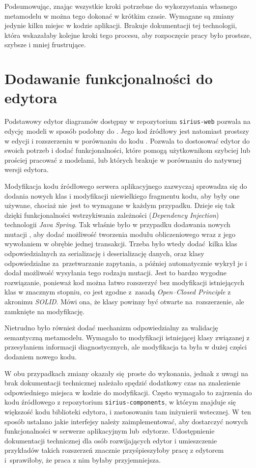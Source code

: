 Podsumowując, znając wszystkie kroki potrzebne do wykorzystania własnego
metamodelu \EMF{} w \SiriusWeb{} można tego dokonać w krótkim czasie.
Wymagane są zmiany jedynie kilku miejsc w kodzie aplikacji. Brakuje
dokumentacji tej technologii, która wskazałaby kolejne kroki tego
procesu, aby rozpoczęcie pracy było prostsze, szybsze i mniej frustrujące.

\section{Dodawanie funkcjonalności do edytora}

Podstawowy edytor diagramów dostępny w repozytorium \texttt{sirius-web}
pozwala na edycję modeli w sposób podobny do \SiriusDesktop{}.
Jego kod źródłowy jest natomiast prostszy w edycji i rozszerzeniu w porównaniu
do kodu \SiriusDesktop{}. Pozwala to dostosować edytor do swoich potrzeb i
dodać funkcjonalności, które pomogą użytkownikom szybciej lub prościej pracować
z modelami, lub których brakuje w porównaniu do natywnej wersji edytora.

Modyfikacja kodu źródłowego serwera aplikacyjnego zazwyczaj sprowadza się do
dodania nowych klas i modyfikacji niewielkiego fragmentu kodu, aby były one
używane, chociaż nie~jest to wymagane w każdym przypadku. Dzieje się tak dzięki
funkcjonalności wstrzykiwania zależności (\emph{Dependency Injection})
technologii \emph{Java Spring}. Tak właśnie było w przypadku dodawania nowych
mutacji \GraphQL{}, aby dodać możliwość tworzenia modułu obliczeniowego
wraz z jego wywołaniem w obrębie jednej transakcji. Trzeba było wtedy
dodać kilka klas odpowiedzialnych za serializację i deserializację danych, oraz
klasy odpowiedzialne za~przetwarzanie zapytania, a później \SiriusWeb{}
automatycznie wykrył je i dodał możliwość wysyłania tego rodzaju mutacji.
Jest to bardzo wygodne rozwiązanie, ponieważ kod można łatwo rozszerzyć bez
modyfikacji istniejących klas w znacznym stopniu, co jest zgodne z~zasadą
\emph{Open--Closed Principle} %
z akronimu \emph{SOLID}. Mówi ona, że klasy powinny być otwarte
na~rozszerzenie, ale zamknięte na modyfikację.

Nietrudno było również dodać mechanizm odpowiedzialny za walidację semantyczną
metamodelu. Wymagało to modyfikacji istniejącej klasy związanej z przesyłaniem
informacji diagnostycznych, ale modyfikacja ta była w dużej części dodaniem
nowego kodu.

W obu przypadkach zmiany okazały się proste do wykonania, jednak z uwagi na
brak dokumentacji technicznej \SiriusWeb{} należało spędzić dodatkowy czas
na znalezienie odpowiedniego miejsca w kodzie do modyfikacji. Często wymagało
to zajrzenia do kodu źródłowego z repozytorium \texttt{sirius-components}, w
którym znajduje się większość kodu biblioteki edytora, i zastosowaniu tam
inżynierii wstecznej. W ten sposób ustalano jakie interfejsy należy
zaimplementować, aby dostarczyć nowych funkcjonalności w serwerze aplikacyjnym
lub~edytorze. Udostępnienie dokumentacji technicznej \SiriusWeb{} dla osób
rozwijających edytor i umieszczenie przykładów takich rozszerzeń znacznie
przyśpieszyłoby pracę z edytorem i~sprawiłoby, że praca z nim byłaby
przyjemniejsza.

